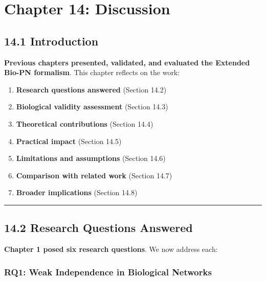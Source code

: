 \hypertarget{chapter-14-discussion}{%
\chapter{Chapter 14: Discussion}\label{chapter-14-discussion}}

\hypertarget{introduction}{%
\section{14.1 Introduction}\label{introduction}}

\textbf{Previous chapters presented, validated, and evaluated the
Extended Bio-PN formalism}. This chapter reflects on the work:

\begin{enumerate}
\def\labelenumi{\arabic{enumi}.}
\tightlist
\item
  \textbf{Research questions answered} (Section 14.2)
\item
  \textbf{Biological validity assessment} (Section 14.3)
\item
  \textbf{Theoretical contributions} (Section 14.4)
\item
  \textbf{Practical impact} (Section 14.5)
\item
  \textbf{Limitations and assumptions} (Section 14.6)
\item
  \textbf{Comparison with related work} (Section 14.7)
\item
  \textbf{Broader implications} (Section 14.8)
\end{enumerate}

\begin{center}\rule{0.5\linewidth}{0.5pt}\end{center}

\hypertarget{research-questions-answered}{%
\section{14.2 Research Questions
Answered}\label{research-questions-answered}}

\textbf{Chapter 1 posed six research questions}. We now address each:

\hypertarget{rq1-weak-independence-in-biological-networks}{%
\subsection{RQ1: Weak Independence in Biological
Networks}\label{rq1-weak-independence-in-biological-networks}}

